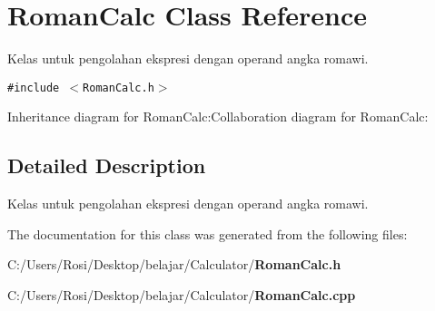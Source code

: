 \section{Roman\-Calc Class Reference}
\label{class_roman_calc}
Kelas untuk pengolahan ekspresi dengan operand angka romawi.  


{\tt \#include $<$Roman\-Calc.h$>$}

Inheritance diagram for Roman\-Calc:Collaboration diagram for Roman\-Calc:

\subsection{Detailed Description}
Kelas untuk pengolahan ekspresi dengan operand angka romawi. 



The documentation for this class was generated from the following files:\begin{CompactItemize}
\item 
C:/Users/Rosi/Desktop/belajar/Calculator/{\bf Roman\-Calc.h}\item 
C:/Users/Rosi/Desktop/belajar/Calculator/{\bf Roman\-Calc.cpp}\end{CompactItemize}
